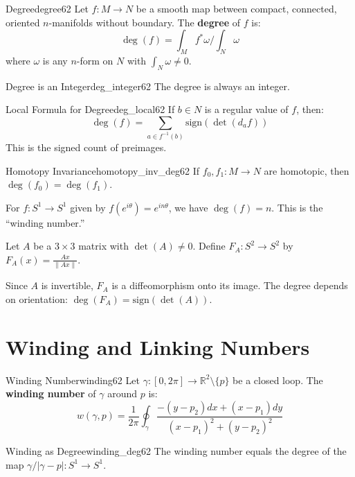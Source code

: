 \documentclass[11pt, letterpaper, openany]{book}
\begin{document}
\begin{defn}{Degree}{degree62}
Let $f: M \to N$ be a smooth map between compact, connected, oriented $n$-manifolds without boundary. The \textbf{degree} of $f$ is:
\[
\deg(f) = \int_M f^*\omega \bigg/ \int_N \omega
\]
where $\omega$ is any $n$-form on $N$ with $\int_N \omega \neq 0$.
\end{defn}

\begin{thm}{Degree is an Integer}{deg_integer62}
The degree is always an integer.
\end{thm}

\begin{thm}{Local Formula for Degree}{deg_local62}
If $b \in N$ is a regular value of $f$, then:
\[
\deg(f) = \sum_{a \in f^{-1}(b)} \text{sign}(\det(d_a f))
\]
This is the signed count of preimages.
\end{thm}

\begin{thm}{Homotopy Invariance}{homotopy_inv_deg62}
If $f_0, f_1: M \to N$ are homotopic, then $\deg(f_0) = \deg(f_1)$.
\end{thm}

\begin{example}
For $f: S^1 \to S^1$ given by $f(e^{i\theta}) = e^{in\theta}$, we have $\deg(f) = n$. This is the ``winding number.''
\end{example}

\begin{example}
Let $A$ be a $3 \times 3$ matrix with $\det(A) \neq 0$. Define $F_A: S^2 \to S^2$ by $F_A(x) = \frac{Ax}{\|Ax\|}$.

Since $A$ is invertible, $F_A$ is a diffeomorphism onto its image. The degree depends on orientation: $\deg(F_A) = \text{sign}(\det(A))$.
\end{example}

\section{Winding and Linking Numbers}

\begin{defn}{Winding Number}{winding62}
Let $\gamma: [0, 2\pi] \to \mathbb{R}^2 \setminus \{p\}$ be a closed loop. The \textbf{winding number} of $\gamma$ around $p$ is:
\[
w(\gamma, p) = \frac{1}{2\pi} \oint_\gamma \frac{-(y-p_2)dx + (x-p_1)dy}{(x-p_1)^2 + (y-p_2)^2}
\]
\end{defn}

\begin{thm}{Winding as Degree}{winding_deg62}
The winding number equals the degree of the map $\gamma/|\gamma - p|: S^1 \to S^1$.
\end{thm}
\end{document}
